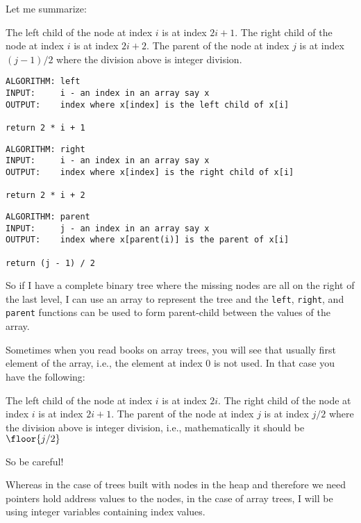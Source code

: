 Let me summarize:
\begin{tightlist}
\li The left child of the node at index $i$ is at index $2i+1$.
\li The right child of the node at index $i$ is at index $2i+2$.
\li The parent of the node at index $j$ is at index $(j - 1)/2$
    where the division above is integer division.
\end{tightlist}


\begin{Verbatim}[frame=single]
ALGORITHM: left
INPUT:     i - an index in an array say x
OUTPUT:    index where x[index] is the left child of x[i]

return 2 * i + 1
\end{Verbatim}
\begin{Verbatim}[frame=single]
ALGORITHM: right
INPUT:     i - an index in an array say x
OUTPUT:    index where x[index] is the right child of x[i]

return 2 * i + 2
\end{Verbatim}
\begin{Verbatim}[frame=single]
ALGORITHM: parent
INPUT:     j - an index in an array say x
OUTPUT:    index where x[parent(i)] is the parent of x[i]

return (j - 1) / 2
\end{Verbatim}

So if I have a complete binary tree where
the missing nodes are all on the right of the last level,
I can use an array to represent the tree
and the \verb!left!, \verb!right!, and \verb!parent!
functions
can be used to form parent-child
between the values of the array.

Sometimes when you read books on array trees, you will see that
usually first element of the array, i.e., the element at
index 0 is not used.
In that case you have the following:
\begin{tightlist}
\li The left child of the node at index $i$ is at index $2i$.
\li The right child of the node at index $i$ is at index $2i+1$.
\li The parent of the node at index $j$ is at index $j / 2$
    where the division above is integer division, i.e., 
    mathematically it should be 
    $\floor{j / 2}$
\end{tightlist}
So be careful!

Whereas in the case of trees built with nodes in the heap
and therefore we need pointers hold address values to the nodes,
in the case of array trees, I will be using integer variables
containing index values.


